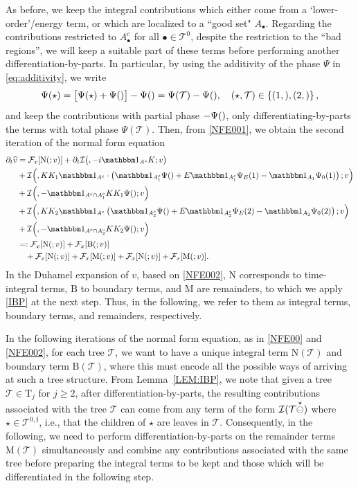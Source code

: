 \documentclass[a4paper,
11pt,  reqno]{amsart}
\makeatletter
\newcommand{\5}{\textup{V}}
\newcommand{\ft}{\widehat}
\newcommand{\ind}{\mathbbm 1}
\newcommand{\dt}{\partial_t}
\theoremstyle{remark}
\newcommand{\bul}{\bullet}
\newcommand{\TT}{\mathcal{T}}
\newcommand{\Tr}{\mathrm{T}}
\newcommand{\Ft}{{\mathcal{F}}}
\newcommand{\ff}{\mathfrak{f}}
\def\<#1>{\csname MH@symb@#1\endcsname}
\newcommand{\Ical}{\mathcal{I}}
\numberwithin{equation}{section}
\numberwithin{theorem}{section}
\newcommand{\MM}{\mathrm{M}}
\newcommand{\NN}{\mathrm{N}}
\newcommand{\BB}{\mathrm{B}}
\makeatother
\begin{document}
As before, we keep the integral contributions which either come from a `lower-order'/energy term, or which are localized to a ``good set" $A_\bul$. Regarding the contributions restricted to $A_\bul^c$ for all $\bul\in \TT^0$, despite the restriction to the ``bad regions'', we will keep a suitable part of these terms before performing another differentiation-by-parts. In particular, by using the additivity of the phase $\Psi$ in \eqref{eq:additivity}, we write
\begin{align}
\Psi(\star) 
= \big[ \Psi(\star) + \Psi(\<1>) \big]- \Psi(\<1>) 
=
\Psi(\TT) - \Psi(\<1>),
\quad (\star, \TT)\in \left\{ (1, \<21>) , (2, \<22>) \right\},
\end{align}
and keep the contributions with partial phase $-\Psi(\<1>)$, only differentiating-by-parts the terms with total phase $\Psi(\TT)$. Then, from \eqref{NFE001}, we obtain the second iteration of the normal form equation
\begin{align}
\dt\ft v
&
= 
 \Ft_x[ \NN ( \<1>; v )] 
+ 
\dt \Ical \big( \<1>, - i  \ind_{A^c} K; v \big)
\\
&
+
\Ical \Big( \<21>,  K K_1 \ind_{A^c} \cdot \left( \ind_{A_1^c} \Psi(\<1>) + E \ind_{A_1^c}  \Psi_E(1) - \ind_{A_1} \Psi_0(1) \right); v  \Big) 
\\
&
+
\Ical \Big( \<21>, - \ind_{A^c \cap A_1^c} KK_1\Psi(\<21>) ; v  \Big) 
\\
&
+
\Ical \Big( \<22>, KK_2 \ind_{A^c} \left( \ind_{A_2^c} \Psi(\<1>) + E \ind_{A_2^c} \Psi_E(2) - \ind_{A_2} \Psi_0(2)\right) ; v  \Big) 
\\
&
+
\Ical \Big( \<22>, - \ind_{A^c \cap A_2^c} KK_2\Psi(\<22>) ; v  \Big) 
\\
&
= : 
 \Ft_x[ \NN ( \<1>; v )]  
+ 
 \Ft_x[ 
\BB(\<1>;v)
] 
\\
&
\quad 
+ 
 \Ft_x[ 
\NN(\<21>; v )
] 
+
 \Ft_x[ 
\MM(\<21>; v )
] 
+
 \Ft_x[ 
\NN(\<22>; v)
]  
+
 \Ft_x[ 
\MM(\<22>;v)
]  
.
\label{NFE002}
\end{align}
In the Duhamel expansion of $v$, based on \eqref{NFE002}, $\NN$ corresponds to time-integral terms, $\BB$ to boundary terms, and $\MM$ are remainders, to which we apply \eqref{IBP} at the next step. Thus, in the following, we refer to them as integral terms, boundary terms, and remainders, respectively.



In the following iterations of the normal form equation, as in \eqref{NFE00} and \eqref{NFE002}, for each tree $\TT$, we want to have a unique integral term $\NN(\TT)$ and boundary term $\BB(\TT)$, 
where this must encode all the possible ways of arriving at such a tree structure. 
From Lemma~\ref{LEM:IBP}, we note that given a tree $\TT \in \Tr_j$ for $j\ge2$, after differentiation-by-parts, the resulting contributions associated with the tree $\TT$ can come from any term of the form $\Ical(\TT \overset{\star}{\ominus} \<1>)$ where $\star \in \TT^{0, \ff}$, i.e., that the children of $\star$ are leaves in $\TT$. Consequently, in the following, we need to perform differentiation-by-parts on the remainder terms $\MM(\TT)$ simultaneously and combine any contributions associated with the same tree before preparing the integral terms to be kept and those which will be differentiated in the following step. 
\end{document}

